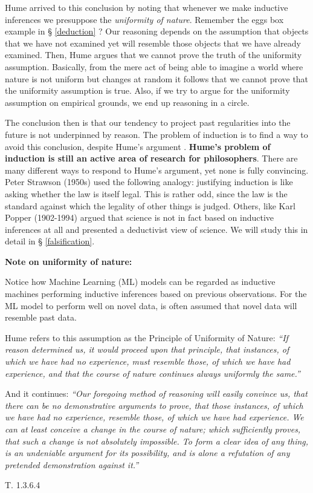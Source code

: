 \documentclass[
]{book}
\begin{document}
Hume arrived to this conclusion by noting that whenever we make inductive inferences we presuppose the \emph{uniformity of nature}. Remember the eggs box example in § \ref{deduction} ? Our reasoning depends on the assumption that objects that we have not examined yet will resemble those objects that we have already examined. Then, Hume argues that we cannot prove the truth of the uniformity assumption. Basically, from the mere act of being able to imagine a world where nature is not uniform but changes at random it follows that we cannot prove that the uniformity assumption is true. Also, if we try to argue for the uniformity assumption on empirical grounds, we end up reasoning in a circle.

The conclusion then is that our tendency to project past regularities into the future is not underpinned by reason. The problem of induction is to find a way to avoid this conclusion, despite Hume's argument \citep{sep-induction-problem}. \textbf{Hume's problem of induction is still an active area of research for philosophers}. There are many different ways to respond to Hume's argument, yet none is fully convincing. Peter Strawson (1950s) used the following analogy: justifying induction is like asking whether the law is itself legal. This is rather odd, since the law is the standard against which the legality of other things is judged. Others, like Karl Popper (1902-1994) argued that science is not in fact based on inductive inferences at all and presented a deductivist view of science. We will study this in detail in § \ref{falsification}.

\begin{tipbox}

\textbf{Note on uniformity of nature:}

Notice how Machine Learning (ML) models can be regarded as inductive machines performing inductive inferences based on previous observations. For the ML model to perform well on novel data, is often assumed that novel data will resemble past data.

Hume refers to this assumption as the Principle of Uniformity of Nature: \emph{``If reason determined us, it would proceed upon that principle, that instances, of which we have had no experience, must resemble those, of which we have had experience, and that the course of nature continues always uniformly the same.''}

And it continues: \emph{``Our foregoing method of reasoning will easily convince us, that there can be no demonstrative arguments to prove, that those instances, of which we have had no experience, resemble those, of which we have had experience. We can at least conceive a change in the course of nature; which sufficiently proves, that such a change is not absolutely impossible. To form a clear idea of any thing, is an undeniable argument for its possibility, and is alone a refutation of any pretended demonstration against it.''}

\citep{hume1739treatise} T. 1.3.6.4

\end{tipbox}
\end{document}

